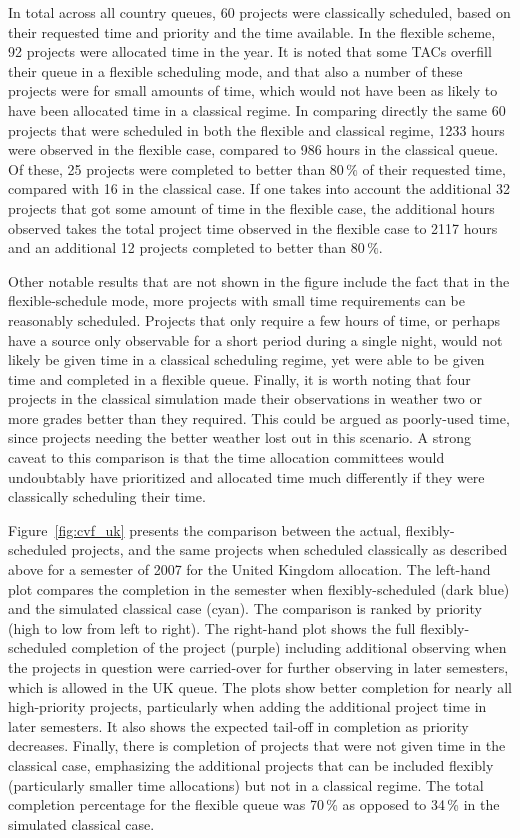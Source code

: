 \documentclass[]{spie}  %
\begin{document}
In total across all country queues, 60 projects were classically
scheduled, based on their requested time and priority and the time
available. In the flexible scheme, 92 projects were allocated time in
the year. It is noted that some TACs overfill their queue in a
flexible scheduling mode, and that also a number of these projects
were for small amounts of time, which would not have been as likely to
have been allocated time in a classical regime. In comparing directly
the same 60 projects that were scheduled in both the flexible and
classical regime, 1233 hours were observed in the flexible case,
compared to 986 hours in the classical queue. Of these, 25 projects
were completed to better than 80\,$\%$ of their requested time, compared
with 16 in the classical case. If one takes into account the
additional 32 projects that got some amount of time in the flexible
case, the additional hours observed takes the total project time
observed in the flexible case to 2117 hours and an additional 12
projects completed to better than 80\,$\%$.

Other notable results that are not shown in the figure include the
fact that in the flexible-schedule mode, more projects with small time
requirements can be reasonably scheduled. Projects that only require a
few hours of time, or perhaps have a source only observable for a
short period during a single night, would not likely be given time in
a classical scheduling regime, yet were able to be given time and
completed in a flexible queue. Finally, it is worth noting that four
projects in the classical simulation made their observations in
weather two or more grades better than they required. This could be
argued as poorly-used time, since projects needing the better weather
lost out in this scenario. A strong caveat to this comparison is that
the time allocation committees would undoubtably have prioritized and
allocated time much differently if they were classically scheduling
their time.

Figure~\ref{fig:cvf_uk} presents the comparison between the actual, flexibly-scheduled projects,
and the same projects when scheduled classically as described
above for a semester of 2007 for the United Kingdom allocation. The left-hand plot compares the completion in the semester when flexibly-scheduled (dark blue) and the simulated classical case (cyan). The comparison is ranked by priority (high to low from left to right). The right-hand plot shows the full flexibly-scheduled completion of the project (purple) including additional observing when the projects in question were carried-over for further observing in later semesters, which is allowed in the UK queue. The plots show better completion for nearly all high-priority projects, particularly when adding the additional project time in later semesters. It also shows the expected tail-off in completion as priority decreases. Finally, there is completion of projects that were not given time in the classical case, emphasizing the additional projects that can be included flexibly (particularly smaller time allocations) but not in a classical regime. The total completion percentage for the flexible queue was 70\,\% as opposed to 34\,\% in the simulated classical case.\\
\end{document}
